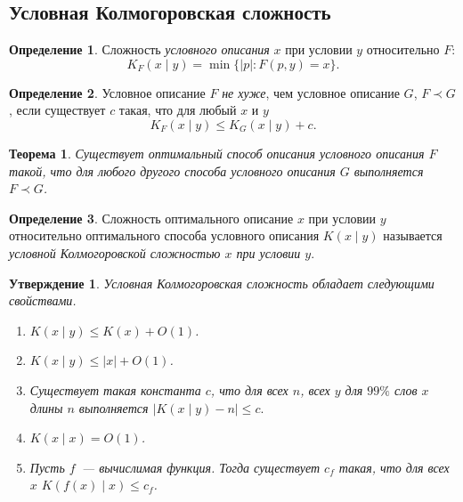 \documentclass[12pt]{article}
\theoremstyle{definition}
\newtheorem{definition}{Определение}
\theoremstyle{plain}
\newtheorem{theorem}{Теорема}[section]
\newtheorem{statement}{Утверждение}[section]
\theoremstyle{remark}
\begin{document}
\subsection{Условная Колмогоровская сложность}
\begin{definition} Сложность \emph{условного описания} $x$ при условии $y$ относительно $F$:
    \[K_F(x\mid y) = \min\{|p| : F(p,y) = x\}.\]
\end{definition}
\begin{definition} Условное описание $F$ \emph{не хуже}, чем условное описание $G$,
    $F\prec G$, если существует $c$ такая, что для любый $x$ и $y$
    \[
        K_F(x\mid y)\le K_G(x\mid y) + c.
    \]
\end{definition}
\begin{theorem}
    Существует оптимальный способ описания условного описания $F$ такой, что для любого
    другого способа условного описания $G$ выполняется $F\prec G$.  
\end{theorem}
\begin{definition}
    Сложность оптимального описание $x$ при условии $y$ относительно оптимального способа условного описания
    $K(x\mid y)$ называется \emph{условной Колмогоровской сложностью $x$ при условии $y$}.
\end{definition}
\begin{statement}
    Условная Колмогоровская сложность обладает следующими свойствами.
\begin{enumerate}
    \item $K(x\mid y)\le K(x) + O(1)$.
    \item $K(x\mid y)\le |x| + O(1)$.
    \item Существует такая константа $c$, что для всех $n$, всех $y$ для $99\%$
        слов $x$ длины $n$ выполняется \(|K(x\mid y) - n|\le c.\)
    \item $K(x\mid x) = O(1)$.
    \item Пусть $f$~--- вычислимая функция. Тогда существует $c_f$ такая, что
        для всех $x$ $K(f(x)\mid x)\le c_f$. 
\end{enumerate}
\end{statement}
\end{document}

